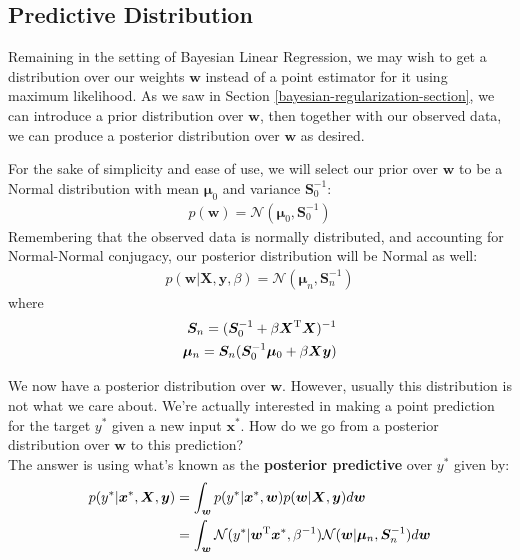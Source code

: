 \subsection{Predictive Distribution}
Remaining in the setting of Bayesian Linear Regression, we may wish to get a distribution over our weights $\bm{w}$ instead of a point estimator for it using maximum likelihood. As we saw in Section \ref{bayesian-regularization-section}, we can introduce a prior distribution over $\bm{w}$, then together with our observed data, we can produce a posterior distribution over $\bm{w}$ as desired.

\begin{derivation}
    For the sake of simplicity and ease of use, we will select our prior over $\bm{w}$ to be a Normal distribution with mean $\boldsymbol{\mu}_0$ and variance $\boldsymbol{S}_0^{-1}$:
    \begin{align*}
        p(\bm{w}) = \mathcal{N}(\boldsymbol{\mu}_0, \boldsymbol{S}_0^{-1})
    \end{align*}
    Remembering that the observed data is normally distributed, and accounting for Normal-Normal conjugacy, our posterior distribution will be Normal as well:
    \begin{align*}
        p(\bm{w}|\bm{X},\bm{y}, \beta) = \mathcal{N}(\boldsymbol{\mu}_n, \boldsymbol{S}_n^{-1})
    \end{align*}
    where
    \begin{align*}
        \boldsymbol{S}_n = (\boldsymbol{S}_0^{-1} + \beta\bm{X}^{\mathrm T}\bm{X})^{-1} \\
        \boldsymbol{\mu}_n = \boldsymbol{S}_n(\boldsymbol{S}_0^{-1}\boldsymbol{\mu}_0 + \beta\bm{X}\bm{y})
    \end{align*}

    We now have a posterior distribution over $\bm{w}$. However, usually this distribution is not what we care about. We're actually interested in making a point prediction for the target $y^*$ given a new input $\bm{x}^*$. How do we go from a posterior distribution over $\bm{w}$ to this prediction? \\

    The answer is using what's known as the \textbf{posterior predictive} over $y^*$ given by:
    \begin{equation}
    \begin{split}
        p(y^* | \bm{x}^*, \bm{X}, \bm{y}) &= \int_{\bm{w}} p(y^* | \bm{x}^*, \bm{w})p(\bm{w} | \bm{X}, \bm{y})d\bm{w} \\
        &= \int_{\bm{w}} \mathcal{N}(y^* | \bm{w}^{\mathrm T}\bm{x}^*, \beta^{-1})\mathcal{N}(\bm{w} | \boldsymbol{\mu}_n, \boldsymbol{S}_n^{-1})d\bm{w}
    \end{split}
    \end{equation}
\end{derivation}

